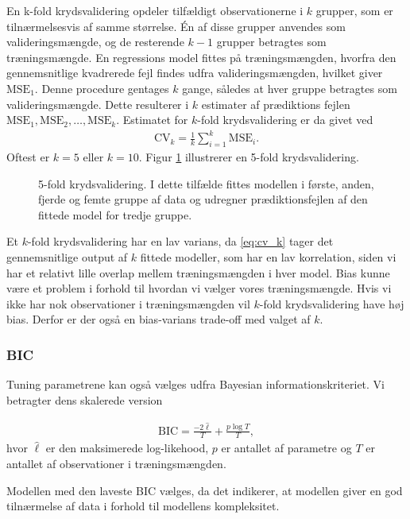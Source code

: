 En k-fold krydsvalidering opdeler tilfældigt observationerne i \(k\) grupper, som er tilnærmelsesvis af samme størrelse.
Én af disse grupper anvendes som valideringsmængde, og de resterende \(k-1\) grupper betragtes som træningsmængde.
En regressions model fittes på træningsmængden, hvorfra den gennemsnitlige kvadrerede fejl findes udfra valideringsmængden, hvilket giver \(\text{MSE}_1\).
Denne procedure gentages \(k\) gange, således at hver gruppe betragtes som valideringsmængde.
Dette resulterer i \(k\) estimater af prædiktions fejlen $\text{MSE}_1, \text{MSE}_2, \dots , \text{MSE}_k$.
Estimatet for \(k\)-fold krydsvalidering er da givet ved
\begin{align}
\text{CV}_k = \frac{1}{k} \sum_{i=1}^k \text{MSE}_i. \label{eq:cv_k}
\end{align}
Oftest er $k=5$ eller $k = 10$. 
Figur \ref{fig:cv_teori} illustrerer en 5-fold krydsvalidering. 
%
\begin{figure}
\center
\scalebox{0.6}{}
\caption{5-fold krydsvalidering. I dette tilfælde fittes modellen i første, anden, fjerde og femte gruppe af data og udregner prædiktionsfejlen af den fittede model for tredje gruppe.} \label{fig:cv_teori}
\end{figure} 
%
Et $k$-fold krydsvalidering har en lav varians, da \eqref{eq:cv_k} tager det gennemsnitlige output af $k$ fittede modeller, som har en lav korrelation, siden vi har et relativt lille overlap mellem træningsmængden i hver model. 
Bias kunne være et problem i forhold til hvordan vi vælger vores træningsmængde. Hvis vi ikke har nok observationer i træningsmængden vil $k$-fold krydsvalidering have høj bias. Derfor er der også en bias-varians trade-off med valget af $k$. 

\subsubsection{BIC}
Tuning parametrene kan også vælges udfra Bayesian informationskriteriet.
Vi betragter dens skalerede version
%
\begin{defn} \label{def:bic}
\begin{align*}
\text{BIC} =  \frac{- 2 \widehat{\ell}}{T} + \frac{p \log T}{T}, 
\end{align*}
hvor \(\widehat{\ell}\) er den maksimerede log-likehood, \(p\) er antallet af parametre og \(T\) er antallet af observationer i træningsmængden.
\end{defn} 
%
Modellen med den laveste BIC vælges, da det indikerer, at modellen giver en god tilnærmelse af data i forhold til modellens kompleksitet. 

